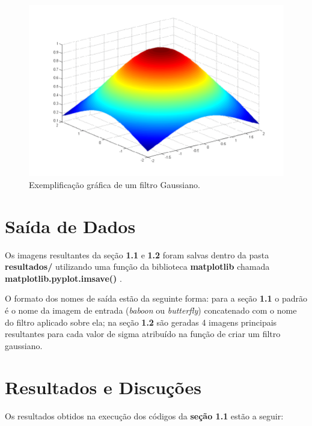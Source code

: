 \documentclass[twoside,twocolumn]{article}
\begin{document}
\begin{figure}[H]
\begin{center}
	\includegraphics[scale=.2]{figures/filtro_gaussiano.png}
\caption{Exemplificação gráfica de um filtro Gaussiano.} \label{gdimotes}
\end{center}
\end{figure}


\section{Saída de Dados}

Os imagens resultantes da seção \textbf{1.1} e \textbf{1.2} foram salvas dentro da pasta \textbf{resultados/} utilizando uma função da biblioteca \textbf{matplotlib} chamada \textbf{matplotlib.pyplot.imsave()} \cite{b3}.

O formato dos nomes de saída estão da seguinte forma: para a seção \textbf{1.1} o padrão é o nome da imagem de entrada (\textit{baboon} ou \textit{butterfly}) concatenado com o nome do filtro aplicado sobre ela; na seção \textbf{1.2} são geradas 4 imagens principais resultantes para cada valor de sigma atribuído na função de criar um filtro gaussiano.


\section{Resultados e Discuções}

Os resultados obtidos na execução dos códigos da \textbf{seção 1.1} estão a seguir:
\end{document}
